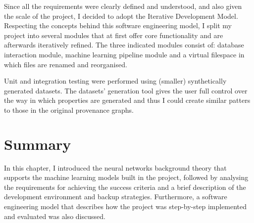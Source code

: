 Since all the requirements were clearly defined and understood, and also given the scale of the project, I decided to adopt the Iterative Development Model. Respecting the concepts behind this software engineering model, I split my project into several modules that at first offer core functionality and are afterwards iteratively refined. The three indicated modules 
consist of: database interaction module, machine learning pipeline module and a virtual filespace in which files are renamed and reorganised. \smallskip

Unit and integration testing were performed using (smaller) synthetically generated datasets. The datasets' generation tool gives the user full control over the way in which properties are generated and thus I could create similar patters to those in the original provenance graphs. \\ 

\section{Summary}

In this chapter, I introduced the neural networks background theory that supports the machine learning models built in the project, followed by analysing the requirements for achieving the success criteria and a brief description of the development environment and backup strategies. Furthermore, a software engineering model that describes how the project was step-by-step implemented and evaluated was also discussed. \\

